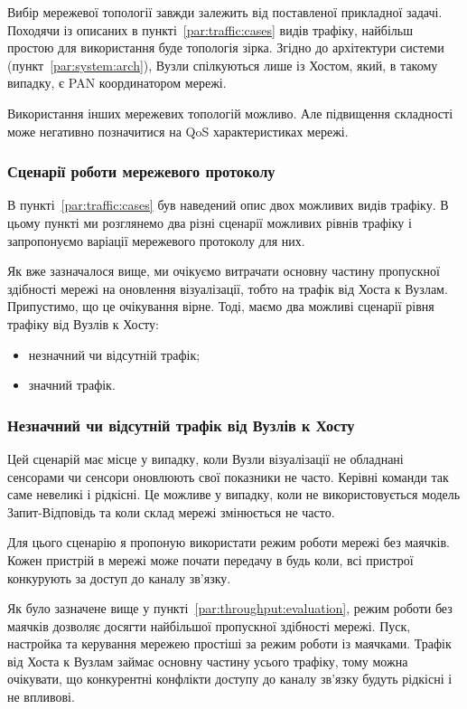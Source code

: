 \documentclass[a4paper,ukrainian,utf8,nocolumnsxix,floatsection]{eskdtext}
\renewcommand\paragraph{\subsubsection}
\begin{document}
Вибір мережевої топології завжди залежить від поставленої прикладної задачі. Походячи із описаних в пункті~\ref{par:traffic:cases} видів трафіку, найбільш простою для використання буде топологія зірка. Згідно до архітектури системи (пункт~\ref{par:system:arch}), Вузли спілкуються лише із Хостом, який, в такому випадку, є PAN координатором мережі.

Використання інших мережевих топологій можливо. Але підвищення складності може негативно позначитися на QoS характеристиках мережі.

\paragraph{Сценарії роботи мережевого протоколу}
\label{par:network:protocol:scenarios}

В пункті~\ref{par:traffic:cases} був наведений опис двох можливих видів трафіку. В цьому пункті ми розглянемо два різні сценарії можливих рівнів трафіку і запропонуємо варіації мережевого протоколу для них.

Як вже зазначалося вище, ми очікуємо витрачати основну частину пропускної здібності мережі на оновлення візуалізації, тобто на трафік від Хоста к Вузлам. Припустимо, що це очікування вірне. Тоді, маємо два можливі сценарії рівня трафіку від Вузлів к Хосту:
\begin{itemize}
	\item незначний чи відсутній трафік;
	\item значний трафік.
\end{itemize}


\paragraph{Незначний чи відсутній трафік від Вузлів к Хосту}
\label{par:low:nthn}

Цей сценарій має місце у випадку, коли Вузли візуалізації не обладнані сенсорами чи сенсори оновлюють свої показники не часто. Керівні команди так саме невеликі і рідкісні. Це можливе у випадку, коли не використовується модель Запит-Відповідь та коли склад мережі змінюється не часто.

Для цього сценарію я пропоную використати режим роботи мережі без маячків. Кожен пристрій в мережі може почати передачу в будь коли, всі пристрої конкурують за доступ до каналу зв’язку. 

Як було зазначене вище у пункті~\ref{par:throughput:evaluation}, режим роботи без маячків дозволяє досягти найбільшої пропускної здібності мережі. Пуск, настройка та керування мережею простіші за режим роботи із маячками. Трафік від Хоста к Вузлам займає основну частину усього трафіку, тому можна очікувати, що конкурентні конфлікти доступу до каналу зв’язку будуть рідкісні і не впливові.
\end{document}
